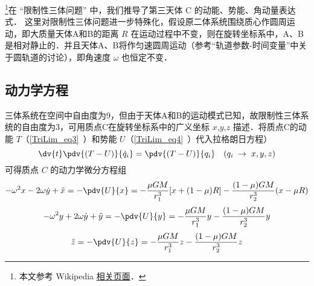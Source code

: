 
\begin{issues}
\issueNeedCite
\end{issues}


\footnote{本文参考 Wikipedia \href{https://en.wikipedia.org/wiki/Jacobi_integral}{相关页面}．}在 “限制性三体问题” 中，我们推导了第三天体 C 的动能、势能、角动量表达式． 这里对限制性三体问题进一步特殊化，假设原二体系统围绕质心作圆周运动，即大质量天体A和B的距离 $R$ 在运动过程中不变，则在旋转坐标系中，A、B是相对静止的．并且天体A、B将作匀速圆周运动（参考“轨道参数-时间变量”中关于圆轨道的讨论），即角速度 $\omega$ 也恒定不变．


\subsection{动力学方程}
三体系统在空间中自由度为9，但由于天体A和B的运动模式已知，故限制性三体系统的自由度为3，可用质点C在旋转坐标系中的广义坐标 $x$,$y$,$z$ 描述．将质点C的动能 $T$（\autoref{TriLim_eq3}~）和势能 $U$（\autoref{TriLim_eq4}~）代入拉格朗日方程）
\begin{equation}%
\dv{t} \pdv{(T-U)}{\dot q_i} = \pdv{(T-U)}{q_i}
\quad (q_i\; \rightarrow \; x,y,z)
\end{equation}
可得质点 $C$ 的动力学微分方程组
\begin{equation}\label{JConst_eq2}
-\omega^2 x - 2\omega\dot{y} + \ddot{x} =- \pdv{U}{x}=-\frac{\mu GM}{r_1^3}[x+(1-\mu)R]-\frac{(1-\mu)GM}{r_2^3}(x-\mu R)
\end{equation}
\begin{equation}\label{JConst_eq3}
-\omega^2 y +2\omega\dot{y} + \ddot{y} =- \pdv{U}{y}=-\frac{\mu GM}{r_1^3}y-\frac{(1-\mu)GM}{r_2^3}y
\end{equation}
\begin{equation}\label{JConst_eq4}
\ddot{z} =- \pdv{U}{z} =-\frac{\mu GM}{r_1^3}z-\frac{(1-\mu)GM}{r_2^3}z
\end{equation}

